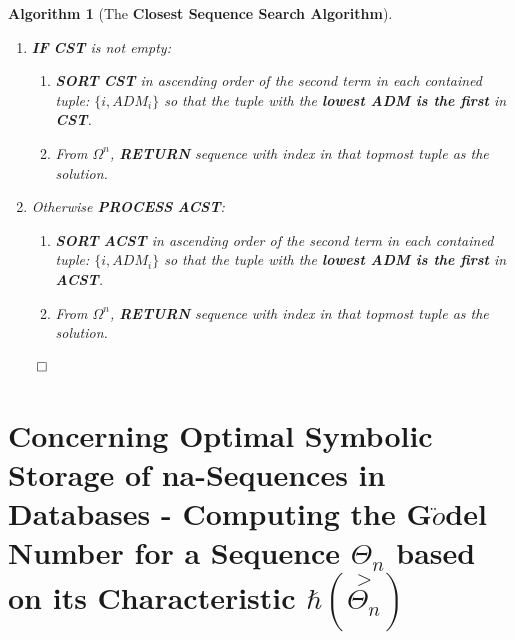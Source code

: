\documentclass[a4paper, 18pt]{book} %
\newtheorem{alg}{Algorithm}
\begin{document}
\begin{alg}[The \textbf{Closest Sequence Search Algorithm}]
\begin{enumerate}
{\begin{enumerate}
{\begin{enumerate}
{			}
		\end{enumerate}			
	}
	\item \textbf{ELSE}/Otherwise:{
	 \begin{enumerate}
	 		\item \textbf{ADJUST} $\psi(\Omega_i)$ and $\psi(Q_k)$ to eliminate uncommon terms
			\item \textbf{COMPUTE} $\tilde{A}(\approx \psi(\Omega_i) \rightarrow \approx \psi(Q_k))$ and store that in \textbf{ADM\_i}
			\item{ \textbf{IFF} \textbf{ADM\_i} $<$ \textbf{ADM\_ACST}: 
			\begin{enumerate}
			\item \textbf{add tuple} $\{i, ADM_i\}$ to \textbf{CST}.
			\item \textbf{UPDATE}: \textbf{ADM\_ACST} := \textbf{ADM\_i}.
			\end{enumerate}
			
			}
		\end{enumerate}			
	}	
	\end{enumerate}
}
\item {\textbf{IF} \textbf{CST} is not empty:
	\begin{enumerate}
	\item \textbf{SORT}  \textbf{CST} in ascending order of the second term in each contained tuple: $\{i, ADM_i\}$ so that the tuple with the \textbf{lowest ADM is the first} in \textbf{CST}.
	\item From  $\Omega^n$, \textbf{RETURN} sequence with index in that topmost tuple as the solution.
	\end{enumerate}
}
\item {Otherwise \textbf{PROCESS} \textbf{ACST}:
	\begin{enumerate}
	\item \textbf{SORT}  \textbf{ACST} in ascending order of the second term in each contained tuple: $\{i, ADM_i\}$ so that the tuple with the \textbf{lowest ADM is the first} in \textbf{ACST}.
	\item From  $\Omega^n$, \textbf{RETURN} sequence with index in that topmost tuple as the solution.
	\end{enumerate}
}
\end{enumerate}
$\qed$
\end{alg}

\section{Concerning Optimal Symbolic Storage of na-Sequences in Databases - Computing the G$\ddot{o}$del Number for a Sequence $\Theta_n$ based on its Characteristic $\hbar(\overset{>}{\Theta_n})$ }
\label{SECSEQSTORAGE}
\end{document}
